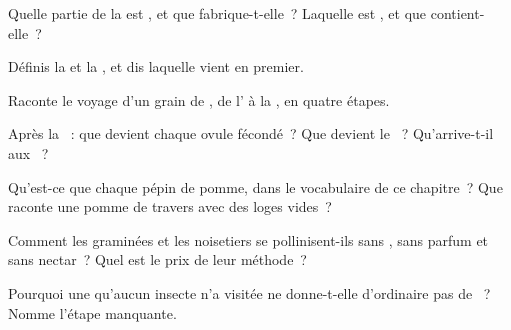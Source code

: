 \begin{exercise}[$\star$]\label{exo:g5:flower-to-fruit:1}
Quelle partie de la  est , et que fabrique-t-elle~?
Laquelle est , et que contient-elle~?
\end{exercise}

\begin{exercise}[$\star$]\label{exo:g5:flower-to-fruit:2}
Définis la  et la , et dis laquelle vient en
premier.
\end{exercise}

\begin{exercise}[$\star$]\label{exo:g5:flower-to-fruit:3}
Raconte le voyage d'un grain de , de l' à la , en quatre étapes.
\end{exercise}

\begin{exercise}[$\star$]\label{exo:g5:flower-to-fruit:4}
Après la ~: que devient chaque ovule fécondé~? Que
devient le ~? Qu'arrive-t-il aux ~?
\end{exercise}

\begin{exercise}[$\star$]\label{exo:g5:flower-to-fruit:5}
Qu'est-ce que chaque pépin de pomme, dans le vocabulaire de ce
chapitre~? Que raconte une pomme de travers avec des loges vides~?
\end{exercise}

\begin{exercise}[$\star$]\label{exo:g5:flower-to-fruit:6}
Comment les graminées et les noisetiers se pollinisent-ils sans
, sans parfum et sans nectar~? Quel est le prix de leur
méthode~?
\end{exercise}

\begin{exercise}[$\star$]\label{exo:g5:flower-to-fruit:7}
Pourquoi une  qu'aucun insecte n'a visitée ne donne-t-elle
d'ordinaire pas de ~? Nomme l'étape manquante.
\end{exercise}

